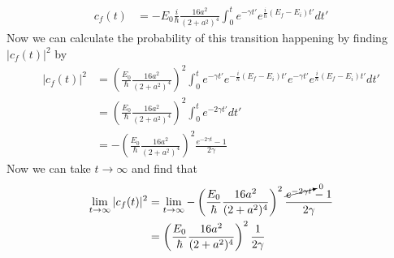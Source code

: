 \documentclass[11pt]{article}
\numberwithin{equation}{section}
\begin{document}
\begin{align*}
c_f(t) &= -E_0\frac{i}{\hbar}\frac{16a^2}{(2+a^2)^4}\int_{0}^{t}e^{-\gamma t'}e^{\frac{i}{\hbar}(E_f-E_i)t'}dt'
\end{align*}
Now we can calculate the probability of this transition happening by finding $|c_f(t)|^2$ by
\begin{align*}
|c_f(t)|^2 &= \left(\frac{E_0}{\hbar}\frac{16a^2}{(2+a^2)^4}\right)^2\int_{0}^{t}e^{-\gamma t'}e^{-\frac{i}{\hbar}(E_f-E_i)t'}e^{-\gamma t'}e^{\frac{i}{\hbar}(E_f-E_i)t'}dt'\\
&= \left(\frac{E_0}{\hbar}\frac{16a^2}{(2+a^2)^4}\right)^2\int_{0}^{t}e^{-2\gamma t'}dt'\\
&= -\left(\frac{E_0}{\hbar}\frac{16a^2}{(2+a^2)^4}\right)^2\frac{e^{-2\gamma t} -1}{2\gamma}
\end{align*}
Now we can take $t\rightarrow\infty$ and find that
\begin{align*}
\lim_{t\rightarrow\infty}|c_f(t)|^2 &= \lim_{t\rightarrow\infty} -\left(\frac{E_0}{\hbar}\frac{16a^2}{(2+a^2)^4}\right)^2\frac{\cancelto{0}{e^{-2\gamma t}} -1}{2\gamma}\\
&= \left(\frac{E_0}{\hbar}\frac{16a^2}{(2+a^2)^4}\right)^2\frac{1}{2\gamma}
\end{align*}
\end{document}
